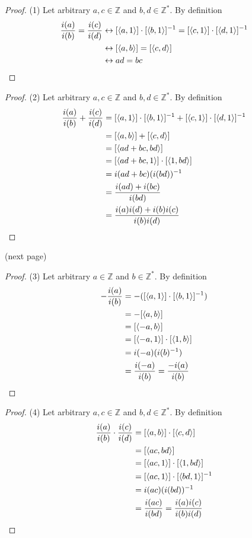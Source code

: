 \documentclass{report}
\begin{document}
\begin{proof}(1)
Let arbitrary $a,c\in\mathbb Z$ and $b,d\in\mathbb Z^*$.
By definition
\begin{align*}
\frac{i(a)}{i(b)}=\frac{i(c)}{i(d)}&\leftrightarrow [\langle a,1\rangle]\cdot[\langle b,1\rangle]^{-1}=[\langle c,1\rangle]\cdot[\langle d,1\rangle]^{-1}\\
&\leftrightarrow[\langle a,b\rangle]=[\langle c,d\rangle]\\
&\leftrightarrow ad=bc\qedhere
\end{align*}
\end{proof}
\begin{proof}(2)
Let arbitrary $a,c\in\mathbb Z$ and $b,d\in\mathbb Z^*$.
By definition
\begin{align*}
\frac{i(a)}{i(b)}+\frac{i(c)}{i(d)}&=[\langle a,1\rangle]\cdot[\langle b,1\rangle]^{-1}+[\langle c,1\rangle]\cdot[\langle d,1\rangle]^{-1}\\
&=[\langle a,b\rangle]+[\langle c,d\rangle]\\
&=[\langle ad+bc,bd\rangle]\\
&=[\langle ad+bc,1\rangle]\cdot[\langle 1,bd\rangle]\\
&=i(ad+bc)(i(bd))^{-1}\\
&=\frac{i(ad)+i(bc)}{i(bd)}\\
&=\frac{i(a)i(d)+i(b)i(c)}{i(b)i(d)}\qedhere
\end{align*}
\end{proof}
\noindent(next page)\newpage
\begin{proof}(3)
Let arbitrary $a\in\mathbb Z$ and $b\in\mathbb Z^*$.
By definition
\begin{align*}
-\frac{i(a)}{i(b)}&=-([\langle a,1\rangle]\cdot[\langle b,1\rangle]^{-1})\\
&=-[\langle a,b\rangle]\\
&=[\langle-a,b\rangle]\\
&=[\langle-a,1\rangle]\cdot[\langle 1,b\rangle]\\
&=i(-a)(i(b)^{-1})\\
&=\frac{i(-a)}{i(b)}=\frac{-i(a)}{i(b)}\qedhere
\end{align*}
\end{proof}
\begin{proof}(4)
Let arbitrary $a,c\in\mathbb Z$ and $b,d\in\mathbb Z^*$.
By definition
\begin{align*}
\frac{i(a)}{i(b)}\cdot\frac{i(c)}{i(d)}&=[\langle a,b\rangle]\cdot[\langle c,d\rangle]\\
&=[\langle ac,bd\rangle]\\
&=[\langle ac,1\rangle]\cdot[\langle 1,bd\rangle]\\
&=[\langle ac,1\rangle]\cdot[\langle bd,1\rangle]^{-1}\\
&=i(ac)(i(bd))^{-1}\\
&=\frac{i(ac)}{i(bd)}=\frac{i(a)i(c)}{i(b)i(d)}\qedhere
\end{align*}
\end{proof}
\end{document}
